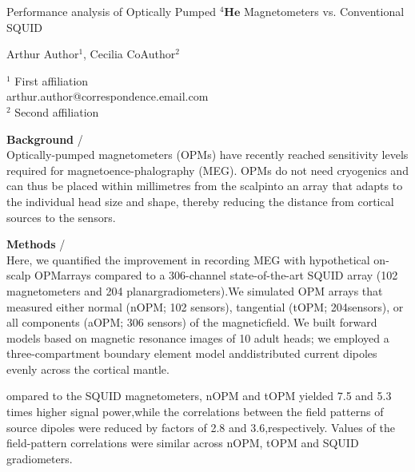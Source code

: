 \documentclass[a4paper]{article}
\begin{document}

\Large
 \begin{center}
 Performance analysis of Optically Pumped ${}^{4}\mathbf{He}$ Magnetometers vs. Conventional SQUID\\ 

\hspace{10pt}

\large
Arthur Author$^1$, Cecilia CoAuthor$^2$ \\

\hspace{10pt}

\small  
$^1$ First affiliation\\
arthur.author@correspondence.email.com\\
$^2$ Second affiliation

\end{center}

\hspace{10pt}

\normalsize
\textbf{Background} / \\

Optically-pumped magnetometers (OPMs) have recently reached sensitivity levels required for magnetoence-phalography (MEG). OPMs do not need cryogenics and can thus be placed within millimetres from the scalpinto an array that adapts to the individual head size and shape, thereby reducing the distance from cortical sources to the sensors.



\textbf{Methods} /  \\

 Here, we quantified the improvement in recording MEG with hypothetical on-scalp OPMarrays compared to a 306-channel state-of-the-art SQUID array (102 magnetometers and 204 planargradiometers).We simulated OPM arrays that measured either normal (nOPM; 102 sensors), tangential (tOPM; 204sensors), or all components (aOPM; 306 sensors) of the magneticfield. We built forward models based on magnetic resonance images of 10 adult heads; we employed a three-compartment boundary element model anddistributed current dipoles evenly across the cortical mantle.
 
 ompared to the SQUID magnetometers, nOPM and tOPM yielded 7.5 and 5.3 times higher signal power,while the correlations between the field patterns of source dipoles were reduced by factors of 2.8 and 3.6,respectively. Values of the field-pattern correlations were similar across nOPM, tOPM and SQUID gradiometers.
\end{document}
